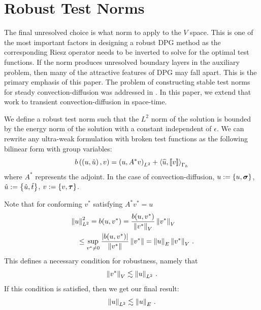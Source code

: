 \documentclass{article}
\theoremstyle{definition}
\theoremstyle{remark}
\begin{document}
\section{Robust Test Norms}
The final unresolved choice is what norm to apply to the $V$ space.
This is one of the most important factors in designing a robust DPG method as the corresponding Riesz operator 
needs to be inverted to solve for the optimal test functions.
If the norm produces unresolved boundary layers in the auxiliary problem, then many of the attractive features of DPG may fall apart.
This is the primary emphasis of this paper.
The problem of constructing stable test norms for steady convection-diffusion was addressed in \cite{DemkowiczHeuer,ChanHeuerThanhDemkowicz2012}.
In this paper, we extend that work to transient convection-diffusion in space-time.

We define a robust test norm such that the $L^2$ norm of the solution 
is bounded by the energy norm of the solution with a constant independent of $\epsilon$.
We can rewrite any ultra-weak formulation with broken test functions as the following
bilinear form with group variables:
\[
b\left( \left( u,\hat u \right),v \right) = \left( u,A^* v \right)_{L^2} + \left\langle \widehat{u}, \left[ \![v]\! \right] \right\rangle_{\Gamma_h}
\]
where $A^*$ represents the adjoint.
In the case of convection-diffusion, $u:=\left\{ u,\boldsymbol\sigma \right\}$, $\hat u:=\left\{ \hat u,\hat t \right\}$, $v:=\left\{ v,\boldsymbol\tau \right\}$.

Note that for conforming $v^*$ satisfying $A^* v^* = u$
\begin{align*}
&\left\| u \right\|_{L^2}^2= b(u,v^*)
=\frac{b(u,v^*)}{\left\| v^* \right\|_V} \left\| v^* \right\|_V\\
&\quad\leq\sup_{v^*\neq0}\frac{|b(u,v^*)|}{\left\| v^* \right\|}\left\| v^* \right\|
=\left\| u \right\|_E \left\| v^* \right\|_V\,.
\end{align*}
This defines a necessary condition for robustness, namely that
\begin{align}
\label{eq:necessaryCondition}
\left\| v^* \right\|_V\lesssim\left\| u \right\|_{L^2}\,.
\end{align}
If this condition is satisfied, then we get our final result:
\begin{align*}
\left\| u \right\|_{L^2}\lesssim\left\| u \right\|_E\,.
\end{align*}
\end{document}
